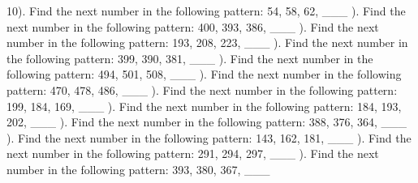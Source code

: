 \documentclass{article}%
\begin{document}
10). Find the next number in the following pattern: 54, 58, 62, \_\_\_%
\newline%
\newline%
). Find the next number in the following pattern: 400, 393, 386, \_\_\_%
\newline%
\newline%
). Find the next number in the following pattern: 193, 208, 223, \_\_\_%
\newline%
\newline%
). Find the next number in the following pattern: 399, 390, 381, \_\_\_%
\newline%
\newline%
). Find the next number in the following pattern: 494, 501, 508, \_\_\_%
\newline%
\newline%
). Find the next number in the following pattern: 470, 478, 486, \_\_\_%
\newline%
\newline%
). Find the next number in the following pattern: 199, 184, 169, \_\_\_%
\newline%
\newline%
). Find the next number in the following pattern: 184, 193, 202, \_\_\_%
\newline%
\newline%
). Find the next number in the following pattern: 388, 376, 364, \_\_\_%
\newline%
\newline%
). Find the next number in the following pattern: 143, 162, 181, \_\_\_%
\newline%
\newline%
). Find the next number in the following pattern: 291, 294, 297, \_\_\_%
\newline%
\newline%
). Find the next number in the following pattern: 393, 380, 367, \_\_\_%
\newline%
\newline%
\end{document}
